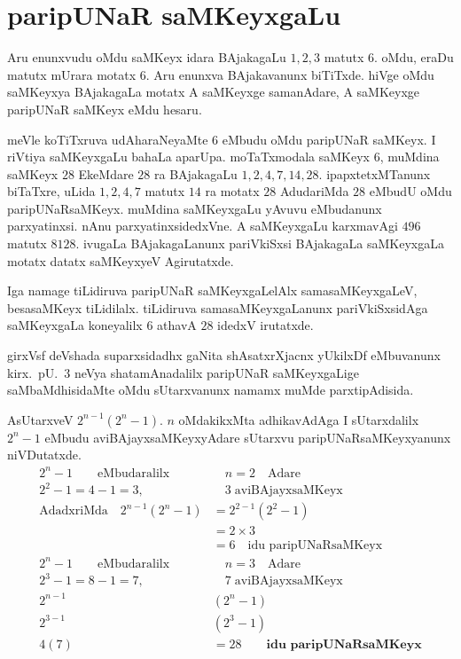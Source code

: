 \chapter{paripUNaR saMKeyxgaLu}
\vskip -20pt

Aru enunxvudu oMdu saMKeyx idara BAjakagaLu $1,2,3$ matutx $6$. oMdu, eraDu matutx mUrara motatx $6$. 
Aru enunxva BAjakavanunx biTiTxde. hiVge oMdu saMKeyxya BAjakagaLa motatx A saMKeyxge samanAdare, A saMKeyxge paripUNaR saMKeyx eMdu hesaru.

meVle koTiTxruva  udAharaNeyaMte $6$ eMbudu oMdu paripUNaR saMKeyx. I riVtiya saMKeyxgaLu bahaLa aparUpa.  moTaTxmodala saMKeyx $6$, muMdina saMKeyx $28$ EkeMdare $28$ ra BAjakagaLu $1,2,4,7,14,28$. ipapxtetxMTanunx biTaTxre, uLida $1,2,4,7$ matutx $14$ ra motatx $28$ AdudariMda $28$ eMbudU oMdu paripUNaRsaMKeyx. muMdina saMKeyxgaLu yAvuvu eMbudanunx parxyatinxsi. nAnu parxyatinxsidedxVne. A saMKeyxgaLu karxmavAgi $496$ matutx $8128$. ivugaLa BAjakagaLanunx pariVkiSxsi BAjakagaLa saMKeyxgaLa motatx datatx saMKeyxyeV Agirutatxde.  

Iga namage tiLidiruva paripUNaR saMKeyxgaLelAlx samasaMKeyxgaLeV, besasaMKeyx tiLidilalx. tiLidiruva samasaMKeyxgaLanunx pariVkiSxsidAga saMKeyxgaLa koneyalilx $6$ athavA $28$ idedxV irutatxde.

girxVsf deVshada suparxsidadhx gaNita shAsatxrXjacnx yUkilxDf eMbuvanunx kirx.~pU.\ $3$ neVya shata\-mAnadalilx paripUNaR saMKeyxgaLige saMbaMdhisidaMte oMdu sUtarxvanunx namamx muMde parxtipAdisida.

AsUtarxveV $2^{n-1}(2^{n}-1)$. $n$ oMdakikxMta adhikavAdAga I sUtarxdalilx $2^{n}-1$ eMbudu aviBAjayxsaMKeyxyAdare sUtarxvu paripUNaRsaMKeyxyanunx niVDutatxde. 
\begin{align*}
2^{n}-1 \qquad\text{eMbudaralilx}&  \quad n=2 \quad\text{Adare}\\
2^{2}-1 = 4-1 =3, &\quad 3\;\text{aviBAjayxsaMKeyx}\\
\text{AdadxriMda}\quad 2^{n-1}(2^{n}-1) &= 2^{2-1}(2^{2}-1)\\
&=2\times 3\\
&=6 \quad \text{idu paripUNaRsaMKeyx}\\[0.1cm]%
2^{n}-1 \qquad\text{eMbudaralilx} &\quad n=3 \quad\text{Adare}\\
2^{3}-1 = 8-1 = 7, &\quad 7\; \text{aviBAjayxsaMKeyx}\\
2^{n-1}&(2^{n}-1)\\
2^{3-1}&(2^{3}-1)\\
4(7) &= 28 \qquad\textbf{idu paripUNaRsaMKeyx}
\end{align*}

